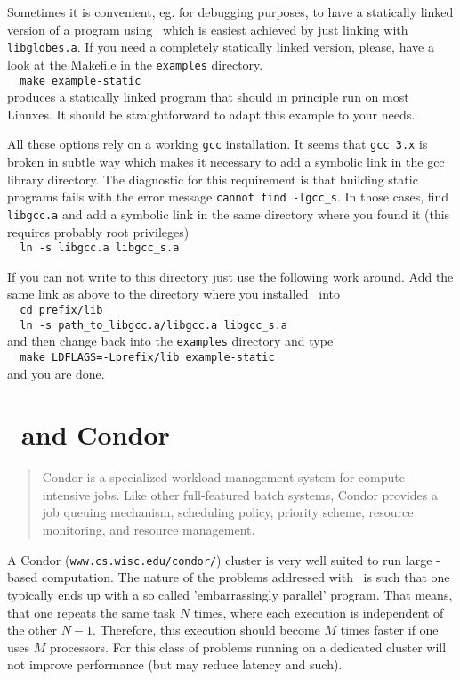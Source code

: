 \begin{appendix}
Sometimes it is convenient, eg. for debugging purposes, to have a
statically linked version of a program using \GLOBES\, which is easiest
achieved by just linking with \verb+libglobes.a+. If you need a completely
statically linked version, please, have a look at the Makefile in the
\verb+examples+ directory.\\
\verb+  make example-static+\\ 
produces a statically linked program that should in principle run on
most Linuxes.  It should be straightforward to adapt this example to
your needs.

All these options rely on a working \verb+gcc+ installation. It seems that
\verb+gcc 3.x+ is broken in subtle way which makes it necessary to add a
symbolic link in the gcc library directory. The diagnostic for this
requirement is that building static programs fails with the error
message \verb+cannot find -lgcc_s+. In those cases, find \verb+libgcc.a+ and add
a symbolic link in the same directory where you found it (this
requires probably root privileges)\\
\verb+  ln -s libgcc.a libgcc_s.a+

If you can not write to this directory just use the following work
around. Add the same link as above to the directory where you
installed \GLOBES\ into\\
\verb+  cd prefix/lib+\\       
\verb+  ln -s path_to_libgcc.a/libgcc.a libgcc_s.a+\\
and then change back into the \verb+examples+ directory and type\\
\verb+  make LDFLAGS=-Lprefix/lib example-static+\\
and you are done.

\section*{\GLOBES\ and Condor}
\label{sec:condor}
\begin{quote}
  Condor is a specialized workload management system for
  compute-intensive jobs. Like other full-featured batch systems,
  Condor provides a job queuing mechanism, scheduling policy,
  priority scheme, resource monitoring, and resource management.
\end{quote} 

A Condor (\verb+www.cs.wisc.edu/condor/+) cluster is very well suited
to run large \GLOBES-based computation. The nature of the problems
addressed with \GLOBES\ is such that one typically ends up with a so
called 'embarrassingly parallel' program. That means, that one repeats
the same task $N$ times, where each execution is independent of the
other $N-1$. Therefore, this execution should become $M$ times faster
if one uses $M$ processors. For this class of problems running on a
dedicated cluster will not improve performance (but may reduce latency
and such).


\end{appendix}

